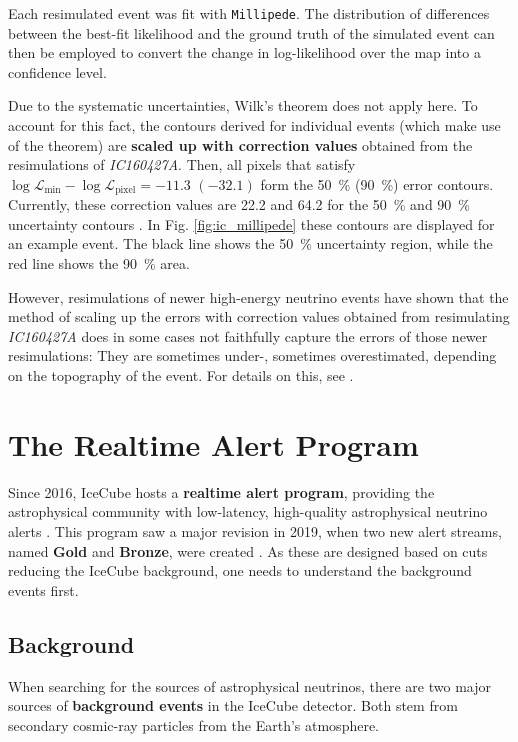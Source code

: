 Each resimulated event was fit with \texttt{Millipede}. The distribution of differences between the best-fit likelihood and the ground truth of the simulated event can then be employed to convert the change in log-likelihood over the map into a confidence level.

Due to the systematic uncertainties, Wilk's theorem does not apply here. To account for this fact, the contours derived for individual events (which make use of the theorem) are \textbf{scaled up with correction values} obtained from the resimulations of \emph{IC160427A}. Then, all pixels that satisfy $\log \mathcal{L}_\text{min}-\log \mathcal{L}_\text{pixel} = -11.3$ $(-32.1)$ form the \SI{50}{\percent} (\SI{90}{\percent}) error contours. Currently, these correction values are 22.2 and 64.2 for the \SI{50}{\percent} and \SI{90}{\percent} uncertainty contours . In Fig. \ref{fig:ic_millipede} these contours are displayed for an example event. The black line shows the \SI{50}{\percent} uncertainty region, while the red line shows the \SI{90}{\percent} area.

However, resimulations of newer high-energy neutrino events have shown that the method of scaling up the errors with correction values obtained from resimulating \emph{IC160427A} does in some cases not faithfully capture the errors of those newer resimulations: They are sometimes under-, sometimes overestimated, depending on the topography of the event. For details on this, see \cite{Gualda2021}.

\section{The Realtime Alert Program}\label{ic_alert_program}
Since 2016, IceCube hosts a \textbf{realtime alert program}, providing the astrophysical community with low-latency, high-quality astrophysical neutrino alerts \cite{Aartsen2017a}. This program saw a major revision in 2019, when two new alert streams, named \textbf{Gold} and \textbf{Bronze}, were created . As these are designed based on cuts reducing the IceCube background, one needs to understand the background events first.

\subsection{Background}\label{background}

When searching for the sources of astrophysical neutrinos, there are two major sources of \textbf{background events} in the IceCube detector. Both stem from secondary cosmic-ray particles from the Earth's atmosphere.

